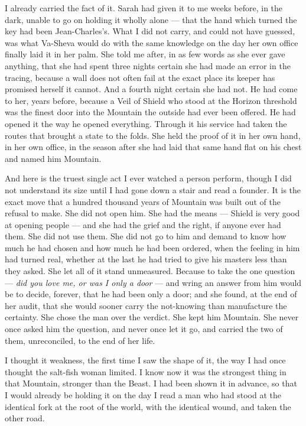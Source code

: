 I already carried the fact of it. Sarah had given it to me weeks before, in the dark, unable to go on holding it wholly alone --- that the hand which turned the key had been Jean-Charles's. What I did not carry, and could not have guessed, was what Va-Sheva would do with the same knowledge on the day her own office finally laid it in her palm. She told me after, in as few words as she ever gave anything, that she had spent three nights certain she had made an error in the tracing, because a wall does not often fail at the exact place its keeper has promised herself it cannot. And a fourth night certain she had not. He had come to her, years before, because a Veil of Shield who stood at the Horizon threshold was the finest door into the Mountain the outside had ever been offered. He had opened it the way he opened everything. Through it his service had taken the routes that brought a state to the folds. She held the proof of it in her own hand, in her own office, in the season after she had laid that same hand flat on his chest and named him Mountain.\par

And here is the truest single act I ever watched a person perform, though I did not understand its size until I had gone down a stair and read a founder. It is the exact move that a hundred thousand years of Mountain was built out of the refusal to make. She did not open him. She had the means --- Shield is very good at opening people --- and she had the grief and the right, if anyone ever had them. She did not use them. She did not go to him and demand to know how much he had chosen and how much he had been ordered, when the feeling in him had turned real, whether at the last he had tried to give his masters less than they asked. She let all of it stand unmeasured. Because to take the one question --- \emph{did you love me, or was I only a door} --- and wring an answer from him would be to decide, forever, that he had been only a door; and she found, at the end of her audit, that she would sooner carry the not-knowing than manufacture the certainty. She chose the man over the verdict. She kept him Mountain. She never once asked him the question, and never once let it go, and carried the two of them, unreconciled, to the end of her life.\par

I thought it weakness, the first time I saw the shape of it, the way I had once thought the salt-fish woman limited. I know now it was the strongest thing in that Mountain, stronger than the Beast. I had been shown it in advance, so that I would already be holding it on the day I read a man who had stood at the identical fork at the root of the world, with the identical wound, and taken the other road.\par

